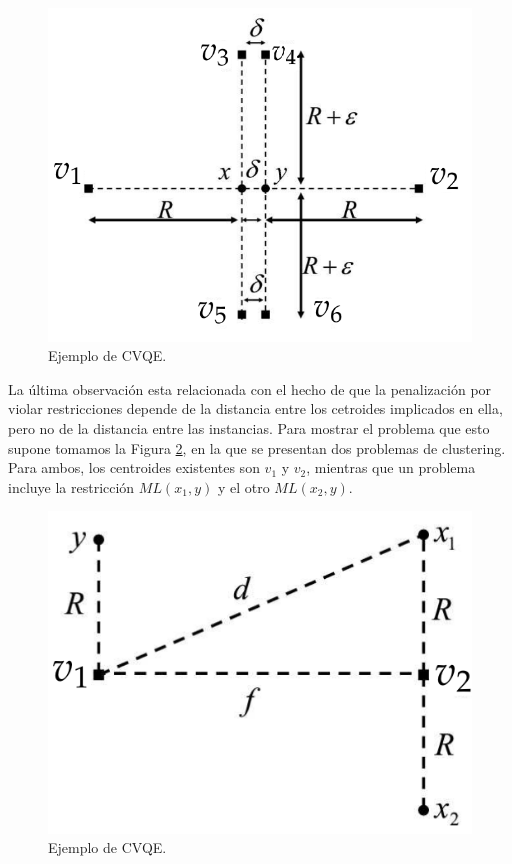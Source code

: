 \begin{figure}[!h]
	\centering
	\includegraphics[scale=0.3]{imagenes/c4/Fig1}
	\caption[Ejemplo de CVQE.]{Ejemplo de CVQE. \cite{LCVQE:2007}}\label{fig:figure19}
\end{figure}

La última observación esta relacionada con el hecho de que la penalización por violar restricciones depende de la distancia entre los cetroides implicados en ella, pero no de la distancia entre las instancias. Para mostrar el problema que esto supone tomamos la Figura \ref{fig:figure20}, en la que se presentan dos problemas de clustering. Para ambos, los centroides existentes son $v_1$ y $v_2$, mientras que un problema incluye la restricción $ML(x_1, y)$ y el otro $ML(x_2, y)$.


\begin{figure}[!h]
	\centering
	\includegraphics[scale=0.3]{imagenes/c4/Fig2}
	\caption[Ejemplo de CVQE.]{Ejemplo de CVQE. \cite{LCVQE:2007}}\label{fig:figure20}
\end{figure}

